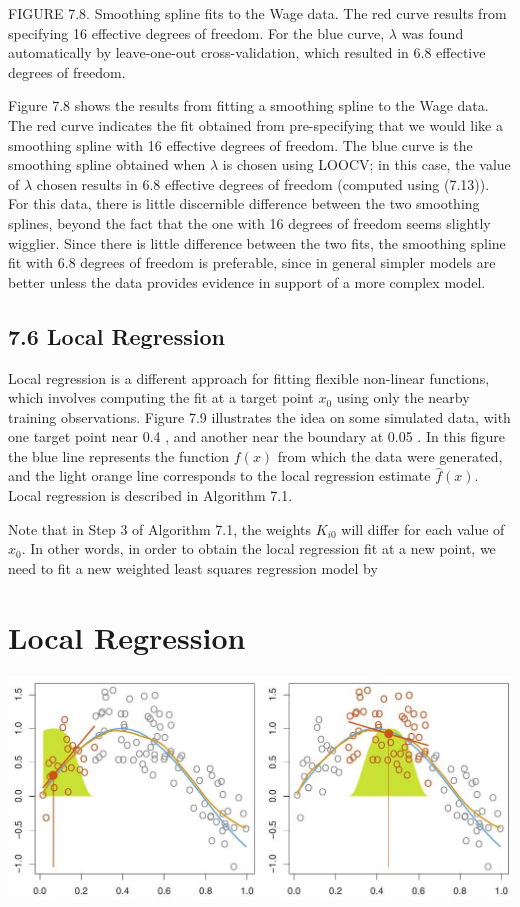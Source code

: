 \documentclass[10pt]{article}
\begin{document}
FIGURE 7.8. Smoothing spline fits to the Wage data. The red curve results from specifying 16 effective degrees of freedom. For the blue curve, $\lambda$ was found automatically by leave-one-out cross-validation, which resulted in 6.8 effective degrees of freedom.

Figure 7.8 shows the results from fitting a smoothing spline to the Wage data. The red curve indicates the fit obtained from pre-specifying that we would like a smoothing spline with 16 effective degrees of freedom. The blue curve is the smoothing spline obtained when $\lambda$ is chosen using LOOCV; in this case, the value of $\lambda$ chosen results in 6.8 effective degrees of freedom (computed using (7.13)). For this data, there is little discernible difference between the two smoothing splines, beyond the fact that the one with 16 degrees of freedom seems slightly wigglier. Since there is little difference between the two fits, the smoothing spline fit with 6.8 degrees of freedom is preferable, since in general simpler models are better unless the data provides evidence in support of a more complex model.

\subsection*{7.6 Local Regression}
Local regression is a different approach for fitting flexible non-linear functions, which involves computing the fit at a target point $x_{0}$ using only the nearby training observations. Figure 7.9 illustrates the idea on some simulated data, with one target point near 0.4 , and another near the boundary at 0.05 . In this figure the blue line represents the function $f(x)$ from which the data were generated, and the light orange line corresponds to the local regression estimate $\hat{f}(x)$. Local regression is described in Algorithm 7.1.

Note that in Step 3 of Algorithm 7.1, the weights $K_{i 0}$ will differ for each value of $x_{0}$. In other words, in order to obtain the local regression fit at a new point, we need to fit a new weighted least squares regression model by

\section*{Local Regression}
\begin{center}
\includegraphics[max width=\textwidth]{2025_05_05_efe77898333945044de4g-296}
\end{center}
\end{document}
